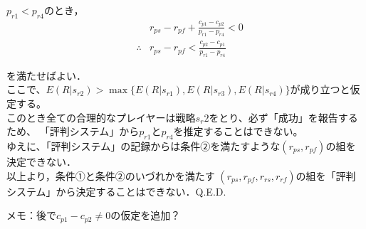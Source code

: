 $p_{r1} < p_{r4}$のとき， 
\begin{eqnarray}
  &&r_{ps} - r_{pf} + \frac{ c_{p1} - c_{p2} }{p_{r1} - p_{r4}} < 0 \nonumber \\
  &\therefore&r_{ps} - r_{pf} < \frac{ c_{p2} - c_{p1} }{ p_{r1} - p_{r4} } \nonumber
\end{eqnarray}

を満たせばよい．\\

ここで、$E(R|s_{r2})>\max\{E(R|s_{r1}), E(R|s_{r3}), E(R|s_{r4}) \}$が成り立つと仮定する。\\

このとき全ての合理的なプレイヤーは戦略$s_r2$をとり、必ず「成功」を報告するため、
「評判システム」から$p_{r1}$と$p_{r4}$を推定することはできない。\\

ゆえに、「評判システム」の記録からは条件②を満たすような$(r_{ps}, r_{pf})$の組を決定できない．\\

以上より，条件①と条件②のいづれかを満たす
$(r_{ps}, r_{pf},r_{rs},r_{rf})$の組を「評判システム」から決定することはできない．Q.E.D.


メモ：後で$c_{p1} - c_{p2} \neq 0$の仮定を追加？

